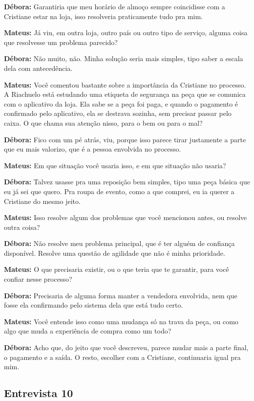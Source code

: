 \textbf{Débora:} Garantiria que meu horário de almoço sempre coincidisse com a Cristiane estar na loja, isso resolveria praticamente tudo pra mim.

\textbf{Mateus:} Já viu, em outra loja, outro país ou outro tipo de serviço, alguma coisa que resolvesse um problema parecido?

\textbf{Débora:} Não muito, não. Minha solução seria mais simples, tipo saber a escala dela com antecedência.

\textbf{Mateus:} Você comentou bastante sobre a importância da Cristiane no processo. A Riachuelo está estudando uma etiqueta de segurança na peça que se comunica com o aplicativo da loja. Ela sabe se a peça foi paga, e quando o pagamento é confirmado pelo aplicativo, ela se destrava sozinha, sem precisar passar pelo caixa. O que chama sua atenção nisso, para o bem ou para o mal?

\textbf{Débora:} Fico com um pé atrás, viu, porque isso parece tirar justamente a parte que eu mais valorizo, que é a pessoa envolvida no processo.

\textbf{Mateus:} Em que situação você usaria isso, e em que situação não usaria?

\textbf{Débora:} Talvez usasse pra uma reposição bem simples, tipo uma peça básica que eu já sei que quero. Pra roupa de evento, como a que comprei, eu ia querer a Cristiane do mesmo jeito.

\textbf{Mateus:} Isso resolve algum dos problemas que você mencionou antes, ou resolve outra coisa?

\textbf{Débora:} Não resolve meu problema principal, que é ter alguém de confiança disponível. Resolve uma questão de agilidade que não é minha prioridade.

\textbf{Mateus:} O que precisaria existir, ou o que teria que te garantir, para você confiar nesse processo?

\textbf{Débora:} Precisaria de alguma forma manter a vendedora envolvida, nem que fosse ela confirmando pelo sistema dela que está tudo certo.

\textbf{Mateus:} Você entende isso como uma mudança só na trava da peça, ou como algo que muda a experiência de compra como um todo?

\textbf{Débora:} Acho que, do jeito que você descreveu, parece mudar mais a parte final, o pagamento e a saída. O resto, escolher com a Cristiane, continuaria igual pra mim.


\subsection*{Entrevista 10}

